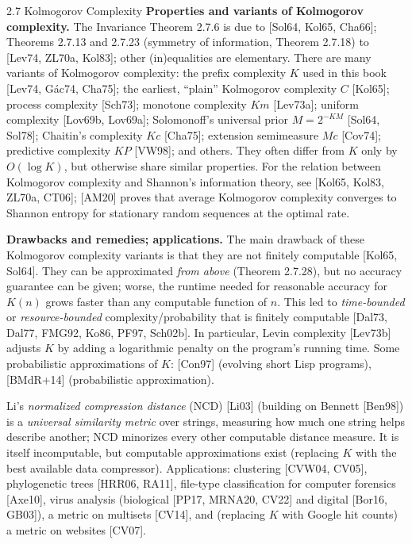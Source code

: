 \documentclass[aspectratio=169,10pt]{beamer}
\begin{document}
\begin{frame}[allowframebreaks]{2.7 Kolmogorov Complexity}
  \textbf{Properties and variants of Kolmogorov complexity.} The Invariance
  Theorem 2.7.6 is due to [Sol64, Kol65, Cha66]; Theorems 2.7.13 and 2.7.23
  (symmetry of information, Theorem 2.7.18) to [Lev74, ZL70a, Kol83]; other
  (in)equalities are elementary. There are many variants of Kolmogorov
  complexity: the prefix complexity $K$ used in this book [Lev74, Gác74,
  Cha75]; the earliest, ``plain'' Kolmogorov complexity $C$ [Kol65];
  process complexity [Sch73]; monotone complexity $Km$ [Lev73a]; uniform
  complexity [Lov69b, Lov69a]; Solomonoff's universal prior $M=2^{-KM}$
  [Sol64, Sol78]; Chaitin's complexity $Kc$ [Cha75]; extension semimeasure
  $Mc$ [Cov74]; predictive complexity $KP$ [VW98]; and others. They often
  differ from $K$ only by $O(\log K)$, but otherwise share similar
  properties. For the relation between Kolmogorov complexity and Shannon's
  information theory, see [Kol65, Kol83, ZL70a, CT06]; [AM20] proves that
  average Kolmogorov complexity converges to Shannon entropy for stationary
  random sequences at the optimal rate.

  \framebreak

  \textbf{Drawbacks and remedies; applications.} The main drawback of these
  Kolmogorov complexity variants is that they are not finitely computable
  [Kol65, Sol64]. They can be approximated \emph{from above} (Theorem
  2.7.28), but no accuracy guarantee can be given; worse, the runtime
  needed for reasonable accuracy for $K(n)$ grows faster than any computable
  function of $n$. This led to \emph{time-bounded} or \emph{resource-bounded}
  complexity/probability that is finitely computable [Dal73, Dal77, FMG92,
  Ko86, PF97, Sch02b]. In particular, Levin complexity [Lev73b] adjusts $K$
  by adding a logarithmic penalty on the program's running time. Some
  probabilistic approximations of $K$: [Con97] (evolving short Lisp
  programs), [BMdR+14] (probabilistic approximation).

  Li's \emph{normalized compression distance} (NCD) [Li03] (building on
  Bennett [Ben98]) is a \emph{universal similarity metric} over strings,
  measuring how much one string helps describe another; NCD minorizes every
  other computable distance measure. It is itself incomputable, but
  computable approximations exist (replacing $K$ with the best available
  data compressor). Applications: clustering [CVW04, CV05], phylogenetic
  trees [HRR06, RA11], file-type classification for computer forensics
  [Axe10], virus analysis (biological [PP17, MRNA20, CV22] and digital
  [Bor16, GB03]), a metric on multisets [CV14], and (replacing $K$ with
  Google hit counts) a metric on websites [CV07].


\end{frame}
\end{document}
